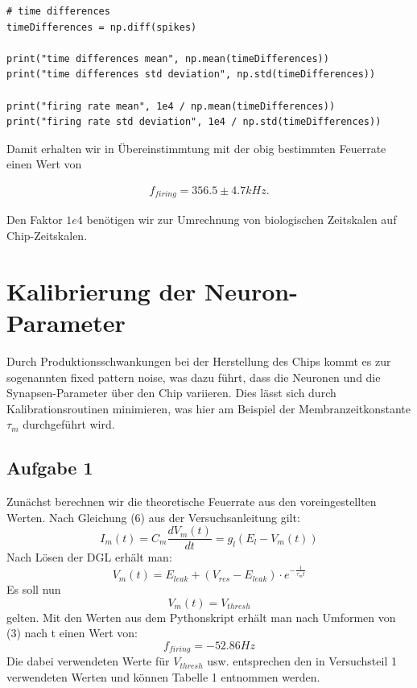 \documentclass[10pt,a4paper]{scrartcl}
\begin{document}
\lstset{language=Python}
\lstset{frame=lines}
\lstset{basicstyle=\footnotesize}
\begin{lstlisting}
# time differences
timeDifferences = np.diff(spikes)

print("time differences mean", np.mean(timeDifferences))
print("time differences std deviation", np.std(timeDifferences))

print("firing rate mean", 1e4 / np.mean(timeDifferences))
print("firing rate std deviation", 1e4 / np.std(timeDifferences))
\end{lstlisting}
%

\noindent Damit erhalten wir in Übereinstimmtung mit der obig bestimmten Feuerrate einen Wert von

\begin{align*}
f_{firing} = 356.5 \pm 4.7kHz.
\end{align*}

\noindent Den Faktor $1e4$ benötigen wir zur Umrechnung von biologischen Zeitskalen auf Chip-Zeitskalen.\\


\newpage


\section{Kalibrierung der Neuron-Parameter}
Durch Produktionsschwankungen bei der Herstellung des Chips kommt es zur sogenannten fixed pattern noise, was dazu führt, dass die Neuronen und die Synapsen-Parameter über den Chip variieren. Dies lässt sich durch Kalibrationsroutinen minimieren, was hier am Beispiel der Membranzeitkonstante $\tau_m$ durchgeführt wird. 

\subsection{Aufgabe 1}
Zunächst berechnen wir die theoretische Feuerrate aus den voreingestellten Werten. Nach Gleichung (6) aus der Versuchsanleitung gilt:
\begin{equation}
I_m(t)=C_m\frac{dV_m(t)}{dt}=g_l(E_l- V_m(t))
\end{equation} 
Nach Lösen der DGL erhält man:
\begin{equation}
V_m(t)=E_{leak} + (V_{res}-E_{leak})\cdot e^{-\frac{1}{\tau_m t}}
\end{equation}
Es soll nun 
\begin{equation}
V_m(t)=V_{thresh}
\end{equation}
gelten. Mit den Werten aus dem Pythonskript erhält man nach Umformen von (3) nach t einen Wert von:
\begin{equation*}
f_{firing}=-52.86 Hz
\end{equation*}
Die dabei verwendeten Werte für $V_{thresh}$ usw. entsprechen den in Versuchsteil 1 verwendeten Werten und können Tabelle 1 entnommen werden.
\end{document}

